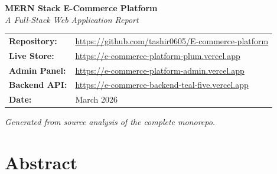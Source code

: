 \documentclass[12pt,a4paper]{report}
\begin{document}
\begin{titlepage}
  \centering
  \vspace*{2cm}

  {\Huge\bfseries MERN Stack E-Commerce Platform}\\[0.8cm]
  {\Large\itshape A Full-Stack Web Application Report}\\[2cm]


  \vspace{2cm}

  \begin{tabular}{ll}
    \textbf{Repository:} & \url{https://github.com/tashir0605/E-commerce-platform} \\[4pt]
    \textbf{Live Store:}  & \url{https://e-commerce-platform-plum.vercel.app} \\[4pt]
    \textbf{Admin Panel:} & \url{https://e-commerce-platform-admin.vercel.app} \\[4pt]
    \textbf{Backend API:} & \url{https://e-commerce-backend-teal-five.vercel.app} \\[4pt]
    \textbf{Date:}        & March 2026 \\
  \end{tabular}

  \vfill
  {\small\textit{Generated from source analysis of the complete monorepo.}}
\end{titlepage}

\chapter*{Abstract}
\end{document}
